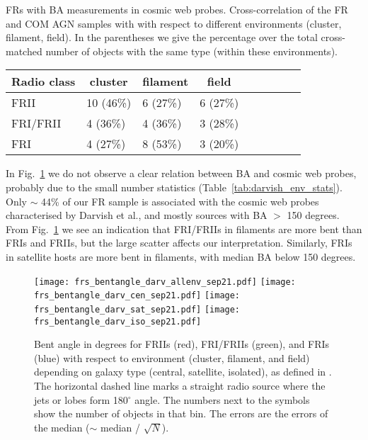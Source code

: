 \documentclass[galaxies,article,submit,moreauthors,pdftex]{Definitions/mdpi}
\begin{document}
\begin{specialtable}[H] 
\caption{FRs with BA measurements in cosmic web probes. Cross-correlation of the FR and COM AGN samples with \cite{darvish17} with respect to different environments (cluster, filament, field). In the parentheses we give the percentage over the total cross-matched number of objects with the same type (within these environments).}
\label{tab:darvish_env_stats}
\begin{tabular}{l l l l l l l l l}
\toprule
\multicolumn{1}{c}{\textbf{Radio class}}   &      \multicolumn{1}{c}{\textbf{cluster}}  &  \multicolumn{1}{c}{\textbf{filament}}   &  \multicolumn{1}{c}{\textbf{field}}                \\     
\midrule
FRII         & 10 (46\%)& 6 (27\%) & 6 (27\%) \\
FRI/FRII  & 4 (36\%) &  4 (36\%) & 3 (28\%) \\
FRI          & 4 (27\%) & 8 (53\%)& 3 (20\%)\\
\bottomrule
\end{tabular}
\end{specialtable}



In Fig.~\ref{fig:bent_darv} we do not observe a clear relation between BA and cosmic web probes, probably due to the small number statistics (Table~\ref{tab:darvish_env_stats}). Only $\sim$ 44\% of our FR sample  is associated with the cosmic web probes characterised by Darvish et al., and mostly sources with BA $>$ 150 degrees. From Fig.~\ref{fig:bent_darv} we see an indication that FRI/FRIIs in filaments are more bent than FRIs and FRIIs, but the large scatter affects our interpretation. Similarly, FRIs in satellite hosts are more bent in filaments, with median BA below 150 degrees.  





   \begin{figure}[!ht]
  \resizebox{\hsize}{!}
 {\texttt{[image: frs\_bentangle\_darv\_allenv\_sep21.pdf]}
 \texttt{[image: frs\_bentangle\_darv\_cen\_sep21.pdf]}
            }
              \resizebox{\hsize}{!}
 {\texttt{[image: frs\_bentangle\_darv\_sat\_sep21.pdf]}
 \texttt{[image: frs\_bentangle\_darv\_iso\_sep21.pdf]}
            }
                 
       \caption{Bent angle in degrees for FRIIs (red), FRI/FRIIs (green), and FRIs (blue) with respect to environment (cluster, filament, and field) depending on galaxy type (central, satellite, isolated), as defined in \cite{darvish17}. The horizontal dashed line marks a straight radio source where the jets or lobes form 180$^{\circ}$ angle. The numbers next to the symbols show the number of objects in that bin. The errors are the errors of the median ($\sim$ median / $\sqrt{N}$).
   }
              \label{fig:bent_darv}%
    \end{figure}
\end{document}
